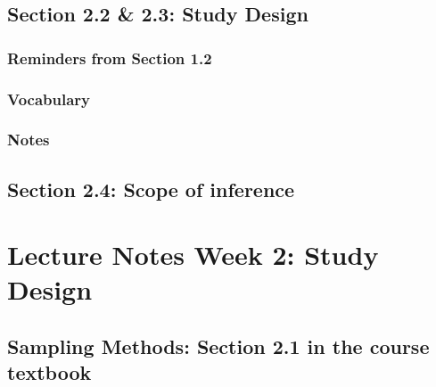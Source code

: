 \documentclass[
]{report}
\begin{document}
\hypertarget{section-2.2-2.3-study-design}{%
\subsection*{Section 2.2 \& 2.3: Study Design}\label{section-2.2-2.3-study-design}}

\hypertarget{reminders-from-section-1.2}{%
\subsubsection*{Reminders from Section 1.2}\label{reminders-from-section-1.2}}

\hypertarget{vocabulary-2}{%
\subsubsection*{Vocabulary}\label{vocabulary-2}}

\hypertarget{notes-2}{%
\subsubsection*{Notes}\label{notes-2}}

\hypertarget{section-2.4-scope-of-inference}{%
\subsection*{Section 2.4: Scope of inference}\label{section-2.4-scope-of-inference}}

\hypertarget{lecture-notes-week-2-study-design}{%
\section{Lecture Notes Week 2: Study Design}\label{lecture-notes-week-2-study-design}}

\hypertarget{sampling-methods-section-2.1-in-the-course-textbook}{%
\subsection*{Sampling Methods: Section 2.1 in the course textbook}\label{sampling-methods-section-2.1-in-the-course-textbook}}
\end{document}
